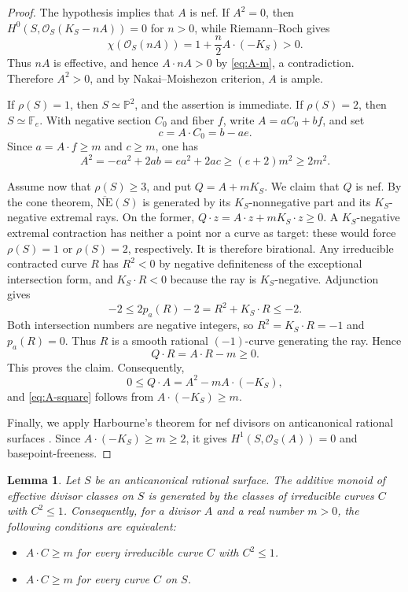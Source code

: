 \documentclass[11pt,reqno]{amsart}
\numberwithin{equation}{section}
\newtheorem{lemma}[lemma]{Lemma}
\theoremstyle{remark}
\newcommand{\sshf}[1]{\mathcal{O}_{#1}}
\newcommand{\prj}[1]{\mathbb{P}^{#1}}
\newcommand{\pa}{p_a}
\begin{document}
\begin{proof}
The hypothesis implies that \(A\) is nef. If \(A^2=0\), then
\(H^0(S,\sshf{S}(K_S-nA))=0\) for \(n>0\), while Riemann--Roch gives
\[
  \chi(\sshf{S}(nA))=1+\frac n2 A\cdot(-K_S)>0.
\]
Thus \(nA\) is effective, and hence \(A\cdot nA>0\) by \eqref{eq:A-m}, a contradiction.
Therefore \(A^2>0\), and by Nakai--Moishezon criterion, \(A\) is ample.

If \(\rho(S)=1\), then \(S\simeq\prj{2}\), and the assertion is immediate.
If \(\rho(S)=2\), then \(S\simeq\mathbb{F}_e\). With negative section
\(C_0\) and fiber \(f\), write \(A=aC_0+bf\), and set
\[
  c=A\cdot C_0=b-ae.
\]
Since \(a=A\cdot f\geq m\) and \(c\geq m\), one has
\[
  A^2=-ea^2+2ab=ea^2+2ac\geq(e+2)m^2\geq2m^2.
\]

Assume now that \(\rho(S)\geq3\), and put \(Q=A+mK_S\). We claim that
\(Q\) is nef. By the cone theorem,
\(\overline{\mathrm{NE}}(S)\) is generated by its \(K_S\)-nonnegative
part and its \(K_S\)-negative extremal rays. On the former,
\(Q\cdot z=A\cdot z+mK_S\cdot z\geq0\). A \(K_S\)-negative extremal
contraction has neither a point nor a curve as target: these would force \(\rho(S)=1\) or \(\rho(S)=2\), respectively. It is therefore
birational. Any irreducible contracted curve \(R\) has \(R^2<0\)
by negative definiteness of the exceptional intersection form, and
\(K_S\cdot R<0\) because the ray is \(K_S\)-negative. Adjunction gives
\[
 -2\leq 2\pa(R)-2=R^2+K_S\cdot R\leq-2.
\]
Both intersection numbers are negative integers, so
\(R^2=K_S\cdot R=-1\) and \(\pa(R)=0\). Thus \(R\) is a smooth
rational \((-1)\)-curve generating the ray. Hence
\[
  Q\cdot R=A\cdot R-m\geq0.
\]
This proves the claim. Consequently,
\[
  0\leq Q\cdot A=A^2-mA\cdot(-K_S),
\]
and \eqref{eq:A-square} follows from
\(A\cdot(-K_S)\geq m\).

Finally, we apply Harbourne's theorem for nef divisors on anticanonical rational
surfaces \cite{Harbourne}. Since
\(A\cdot(-K_S)\geq m\geq2\), it gives
\(H^1(S,\sshf{S}(A))=0\) and basepoint-freeness.
\end{proof}

\begin{lemma}
\label{lem:small-self-intersection}
Let \(S\) be an anticanonical rational surface. The additive monoid
of effective divisor classes on \(S\) is generated by the classes of
irreducible curves \(C\) with \(C^2\leq1\). Consequently, for a divisor \(A\) and a real number \(m>0\), the following conditions are equivalent:
\begin{itemize}
    \item \(A\cdot C\geq m\) for every irreducible curve \(C\) with \(C^2\leq1\).
    \item \(A\cdot C\geq m\) for every curve $C$ on \(S\).
\end{itemize}
\end{lemma}
\end{document}
